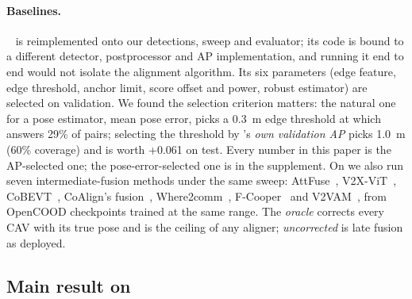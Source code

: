\paragraph{Baselines.}
\freealign~\cite{lei2024freealign} is reimplemented onto our detections, sweep and evaluator; its code is bound to a different detector, postprocessor and AP implementation, and running it end to end would not isolate the alignment algorithm. Its six parameters (edge feature, edge threshold, anchor limit, score offset and power, robust estimator) are selected on validation. We found the selection criterion matters: the natural one for a pose estimator, mean pose error, picks a \SI{0.3}{m} edge threshold at which \freealign answers 29\% of \vxreal pairs; selecting the threshold by \freealign's \emph{own validation AP} picks \SI{1.0}{m} (60\% coverage) and is worth +0.061  on test. Every \freealign number in this paper is the AP-selected one; the pose-error-selected one is in the supplement. On \opvv we also run seven intermediate-fusion methods under the same sweep: AttFuse~\cite{xu2022opv2v}, V2X-ViT~\cite{xu2022v2xvit}, CoBEVT~\cite{xu2022cobevt}, CoAlign's fusion~\cite{lu2023coalign}, Where2comm~\cite{hu2022where2comm}, F-Cooper~\cite{chen2019fcooper} and V2VAM~\cite{li2023v2vam}, from OpenCOOD checkpoints trained at the same range. The \emph{oracle} corrects every CAV with its true pose and is the ceiling of any aligner; \emph{uncorrected} is late fusion as deployed.

\subsection{Main result on \vxreal}
\label{sec:main}

